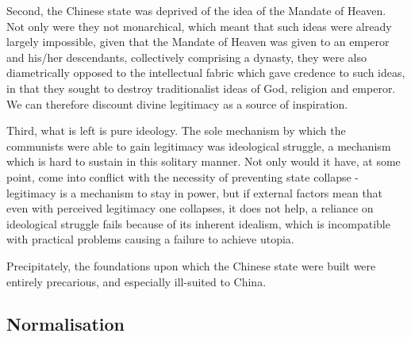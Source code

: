 \documentclass[11pt,a4paper]{report}
\newcounter{count}
\begin{document}
\begin{multicols}{2}
Second, the Chinese state was deprived of the idea of the Mandate of Heaven. Not only were they not monarchical, which meant that such ideas were already largely impossible, given that the Mandate of Heaven was given to an emperor and his/her descendants, collectively comprising a dynasty, they were also diametrically opposed to the intellectual fabric which gave credence to such ideas, in that they sought to destroy traditionalist ideas of God, religion and emperor. We can therefore discount divine legitimacy as a source of inspiration.

Third, what is left is pure ideology. The sole mechanism by which the communists were able to gain legitimacy was ideological struggle, a mechanism which is hard to sustain in this solitary manner. Not only would it have, at some point, come into conflict with the necessity of preventing state collapse - legitimacy is a mechanism to stay in power, but if external factors mean that even with perceived legitimacy one collapses, it does not help, a reliance on ideological struggle fails because of its inherent idealism, which is incompatible with practical problems causing a failure to achieve utopia.

Precipitately, the foundations upon which the Chinese state were built were entirely precarious, and especially ill-suited to China.

\end{multicols}

\subsection{Normalisation}
\end{document}
